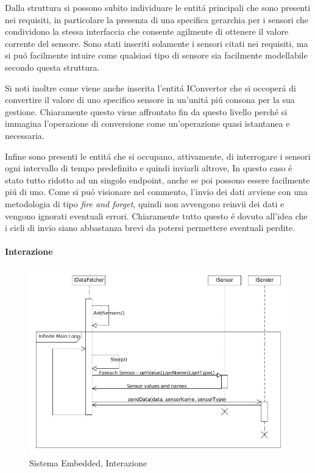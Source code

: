 Dalla struttura si possono subito individuare le entit\'a principali che sono presenti nei requisiti, in particolare la presenza di una specifica gerarchia per i sensori che condividono la stessa interfaccia che consente agilmente di ottenere il valore corrente del sensore. Sono stati inseriti solamente i sensori citati nei requisiti, ma si pu\'o facilmente intuire come qualsiasi tipo di sensore sia facilmente modellabile secondo questa struttura.

Si noti inoltre come viene anche inserita l'entit\'a IConvertor che si occoper\'a di convertire il valore di uno specifico sensore in un'unit\'a pi\'u consona per la sua gestione. Chiaramente questo viene affrontato fin da questo livello perch\'e si immagina l'operazione di conversione come un'operazione quasi istantanea e necessaria.

Infine sono presenti le entit\'a che si occupano, attivamente, di interrogare i sensori ogni intervallo di tempo predefinito e quindi inviarli altrove, In questo caso \'e stato tutto ridotto ad un singolo endpoint, anche se poi possono essere facilmente pi\'u di uno. Come si pu\'o visionare nel commento, l'invio dei dati avviene con una metodologia di tipo \textit{fire and forget}, quindi non avvengono reinvii dei dati e vengono ignorati eventuali errori. Chiaramente tutto questo \'e dovuto all'idea che i cicli di invio siano abbastanza brevi da potersi permettere eventuali perdite.

\paragraph{Interazione}

\begin{figure}[h]
\centering
\includegraphics[width=\textwidth]{Figures/DomainModel/EmbeddedSystem/Interaction}
\caption{Sistema Embedded, Interazione}
\end{figure}

